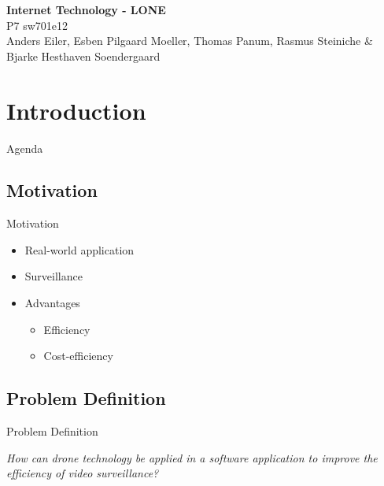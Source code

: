 \author{Rasmus Steiniche}
\begin{frame}{}
	\begin{center}
		\huge \textbf{Internet Technology - LONE}\\
		\normalsize P7 sw701e12\\
		\tiny{Anders Eiler, Esben Pilgaard Moeller, Thomas Panum,}
		\tiny{Rasmus Steiniche \& Bjarke Hesthaven Soendergaard}
	\end{center}
\end{frame}

\section{Introduction}
\begin{frame}{Agenda}{}
\tableofcontents
\end{frame}

\subsection{Motivation}
\begin{frame}{Motivation}
\begin{itemize}
	\item Real-world application
	\item Surveillance
	\item Advantages
	\begin{itemize}
		\item Efficiency
		\item Cost-efficiency
	\end{itemize}
\end{itemize}
\end{frame}

\subsection{Problem Definition}
\begin{frame}{Problem Definition}
\begin{center}
	\textit{How can drone technology be applied in a software application to improve the efficiency of video surveillance?}
\end{center}
\end{frame}